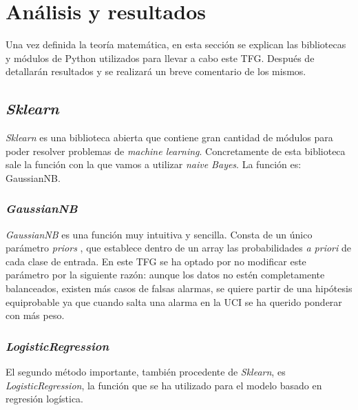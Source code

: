 \chapter{Análisis y resultados}

Una vez definida la teoría matemática, en esta sección se explican las bibliotecas y módulos de Python utilizados para llevar a cabo este TFG. Después de detallarán resultados y se realizará un breve comentario de los mismos. \par 

\section{\textit{Sklearn}}

\textit{Sklearn} es una biblioteca abierta que contiene gran cantidad de módulos para poder resolver problemas de \textit{machine learning}. Concretamente de esta biblioteca sale la función con la que vamos a utilizar \textit{naive Bayes}. La función es: GaussianNB.

\subsection{\textit{GaussianNB}}

\textit{GaussianNB} es una función muy intuitiva y sencilla. Consta de un único parámetro \textit{priors} \cite{gaussiannb}, que establece dentro de un array las probabilidades \textit{a priori} de cada clase de entrada. En este TFG se ha optado por no modificar este parámetro por la siguiente razón: aunque los datos no estén completamente balanceados, existen más casos de falsas alarmas, se quiere partir de una hipótesis equiprobable ya que cuando salta una alarma en la UCI se ha querido ponderar con más peso.

\subsection{\textit{LogisticRegression}} 

El segundo método importante, también procedente de \textit{Sklearn}, es \textit{LogisticRegression}, la función que se ha utilizado para el modelo basado en regresión logística. \cite{logisticregression}

